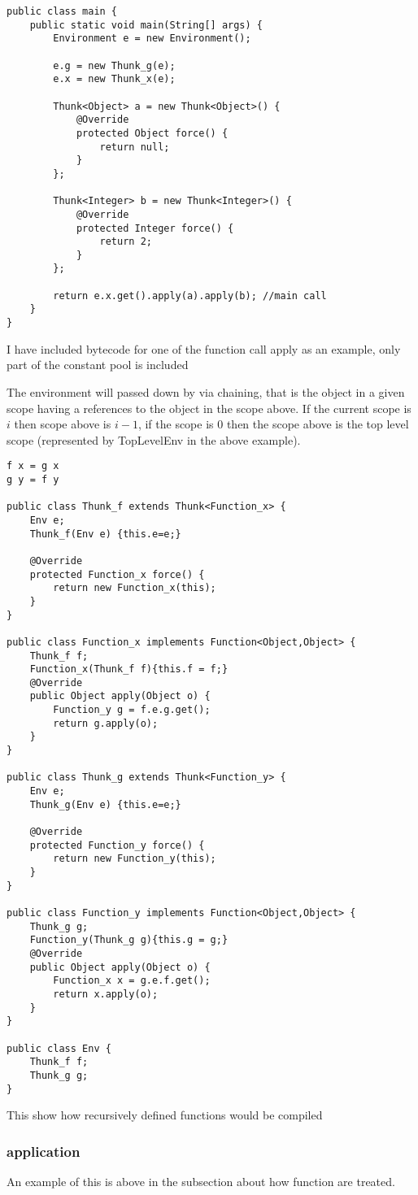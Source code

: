 \documentclass[12pt,a4paper,twoside]{article}
\begin{document}
\begin{verbatim}
public class main {
    public static void main(String[] args) {
        Environment e = new Environment();

        e.g = new Thunk_g(e);
        e.x = new Thunk_x(e);

        Thunk<Object> a = new Thunk<Object>() {
            @Override
            protected Object force() {
                return null;
            }
        };

        Thunk<Integer> b = new Thunk<Integer>() {
            @Override
            protected Integer force() {
                return 2;
            }
        };
        
        return e.x.get().apply(a).apply(b); //main call
    }
}
\end{verbatim}

I have included bytecode for one of the function call apply as an example, only part of the constant pool is
included


The environment will passed down by via chaining, that is the object in a given scope
having a references to the object in the scope above. If the current scope is $i$ then scope above is
$i-1$, if the scope is $0$ then the scope above is the top level scope (represented by TopLevelEnv in the above example).

\begin{verbatim}
f x = g x
g y = f y

public class Thunk_f extends Thunk<Function_x> {
    Env e;
    Thunk_f(Env e) {this.e=e;}

    @Override
    protected Function_x force() {
        return new Function_x(this);
    }
}

public class Function_x implements Function<Object,Object> {
    Thunk_f f;
    Function_x(Thunk_f f){this.f = f;}
    @Override
    public Object apply(Object o) {
        Function_y g = f.e.g.get();
        return g.apply(o);
    }
}

public class Thunk_g extends Thunk<Function_y> {
    Env e;
    Thunk_g(Env e) {this.e=e;}

    @Override
    protected Function_y force() {
        return new Function_y(this);
    }
}

public class Function_y implements Function<Object,Object> {
    Thunk_g g;
    Function_y(Thunk_g g){this.g = g;}
    @Override
    public Object apply(Object o) {
        Function_x x = g.e.f.get();
        return x.apply(o);
    }
}

public class Env {
    Thunk_f f;
    Thunk_g g;
}
\end{verbatim}

This show how recursively defined functions would be compiled

\subsubsection{application}

An example of this is above in the subsection about how function are treated.
\end{document}
